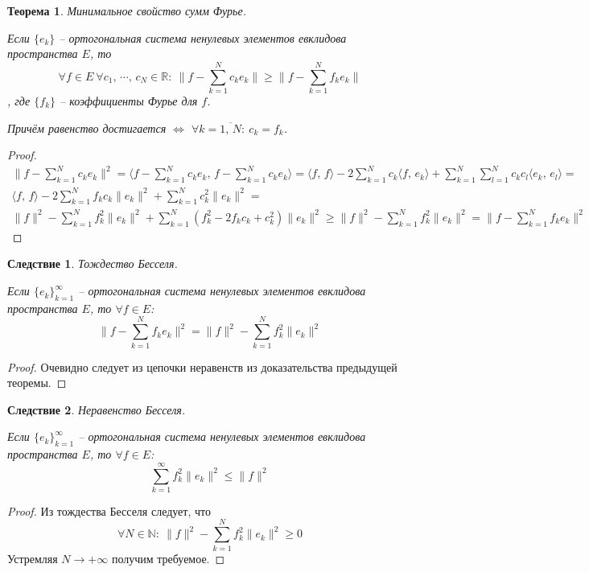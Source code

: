 \documentclass[a4paper,12pt]{article}
\renewcommand{\leq}{\ensuremath{\leqslant}}
\renewcommand{\geq}{\ensuremath{\geqslant}}
\theoremstyle{plain}
\newtheorem{theorem}{Теорема}[section]
\newtheorem*{corollary}{Следствие}
\theoremstyle{definition}
\theoremstyle{remark}
\begin{document}
\begin{theorem}
	Минимальное свойство сумм Фурье.

	Если $\{e_k\}$ -- ортогональная система ненулевых элементов евклидова пространства $E$, то
	\[\forall f \in E \: \forall c_1,\,\cdots,\,c_N \in \mathbb{R}:\: \|f - \sum_{k = 1}^N c_ke_k\| \geq \|f - \sum_{k = 1}^N f_ke_k\|\], где $\{f_k\}$ -- коэффициенты Фурье для $f$.

	Причём равенство достигается $\Leftrightarrow$ $\forall k = \overline{1,\,N}:\: c_k = f_k$.
\end{theorem}
\begin{proof}
	\begin{align*}
		\|f - \sum_{k=1}^N c_ke_k\|^2 = \langle f - \sum_{k = 1}^N c_ke_k,\, f - \sum_{k = 1}^N c_ke_k\rangle = \langle f,\,f\rangle - 2\sum_{k = 1}^Nc_k \langle f,\, e_k\rangle + \sum_{k = 1}^N\sum_{l = 1}^N c_kc_l \langle e_k,\, e_l \rangle = \\
		\langle f,\, f\rangle - 2\sum_{k = 1}^N f_kc_k \|e_k\|^2 + \sum_{k = 1}^Nc_k^2\|e_k\|^2 =                                                                                                                                                    \\
		\|f\|^2 - \sum_{k = 1}^N f_k^2\|e_k\|^2 + \sum_{k = 1}^N (f_k^2 - 2f_kc_k + c_k^2)\|e_k\|^2 \geq \|f\|^2 - \sum_{k = 1}^Nf_k^2\|e_k\|^2 = \|f - \sum_{k = 1}^N f_ke_k\|^2
	\end{align*}
\end{proof}

\begin{corollary}
	Тождество Бесселя.

	Если $\{e_k\}_{k = 1}^\infty$ -- ортогональная система ненулевых элементов евклидова пространства $E$, то $\forall f \in E$:
	\[\|f - \sum_{k = 1}^N f_ke_k\|^2 = \|f\|^2 - \sum_{k = 1}^Nf_k^2\|e_k\|^2\]
\end{corollary}
\begin{proof}
	Очевидно следует из цепочки неравенств из доказательства предыдущей теоремы.
\end{proof}

\begin{corollary}
	Неравенство Бесселя.

	Если $\{e_k\}_{k = 1}^\infty$ -- ортогональная система ненулевых элементов евклидова пространства $E$, то $\forall f \in E$:
	\[\sum_{k = 1}^\infty f_k^2 \|e_k\|^2 \leq \|f\|^2\]
\end{corollary}
\begin{proof}
	Из тождества Бесселя следует, что
	\[\forall N \in \mathbb{N}:\: \|f\|^2 - \sum_{k = 1}^Nf_k^2\|e_k\|^2 \geq 0\]
	Устремляя $N \to +\infty$ получим требуемое.
\end{proof}
\end{document}
